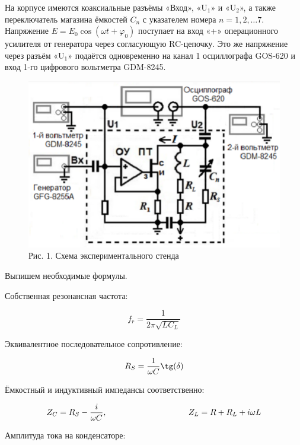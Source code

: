 \documentclass[a4paper,12pt]{article} %
\begin{document}
	
	На корпусе имеются коаксиальные разъёмы «Вход», «U$_1$» и «U$_2$», а также переключатель магазина ёмкостей $C_n$ с указателем номера $n = 1, 2, … 7$. Напряжение $E =E_0\cos(\omega t + \varphi_0)$ поступает на вход «+» операционного усилителя от генератора через согласующую RC-цепочку. Это же напряжение через разъём «U$_1$» подаётся одновременно на канал 1 осциллографа GOS-620 и вход 1-го цифрового вольтметра GDM-8245.
	\begin{figure}[h!]
		\centering
		\includegraphics[scale=0.6]{Pictures/Установка.png}
		\caption*{Рис. 1. Схема экспериментального стенда}
	\end{figure}

\vspace{7mm}
Выпишем необходимые формулы.

Собственная резонансная частота:

\begin{equation*}
	f_r = \frac{1}{2\pi\sqrt{LC_L}}
\end{equation*}

Эквивалентное последовательное сопротивление:

\begin{equation*}
	R_S = \frac{1}{\omega C}\tg(\delta)
\end{equation*}

Ёмкостный и индуктивный импедансы соответственно:

\begin{equation*}
	Z_C = R_S - \frac{i}{\omega C}, \hspace{35mm} Z_L = R + R_L + i\omega L
\end{equation*}


Амплитуда тока на конденсаторе:
\end{document}
